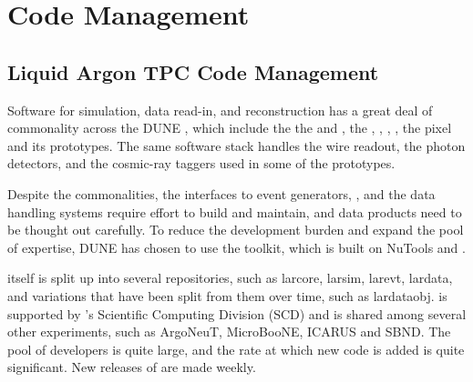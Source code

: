\documentclass[../main-v1.tex]{subfiles}
\begin{document}
\chapter{Code Management }
\label{ch:codemgmt}


\section{Liquid Argon TPC Code Management }
\label{sec:codemgmt:dunetpc}  %

Software for simulation, data read-in, and reconstruction %
has a great deal of commonality across the %
DUNE , %
which include the %
the  and  , the , , , ,  the pixel  and its prototypes.  The same software stack handles the wire readout, the photon detectors, and the cosmic-ray taggers used in some of the prototypes.  

Despite the commonalities, the interfaces to event generators, ,  and the data handling systems require effort to build and maintain, and data products need to be thought out carefully.  To reduce the development burden and expand the pool of expertise, DUNE has chosen to use the  toolkit, which is built on NuTools and .  

 itself is split up into several repositories, such as larcore, larsim, larevt, lardata, and variations that have been split from them over time, such as lardataobj.   is supported by 's Scientific Computing Division (SCD) and is shared among several other experiments, such as ArgoNeuT, MicroBooNE, ICARUS and SBND.  The pool of developers is quite large, and the rate at which new code is added is quite significant.  New releases of  are made weekly.  
\end{document}
